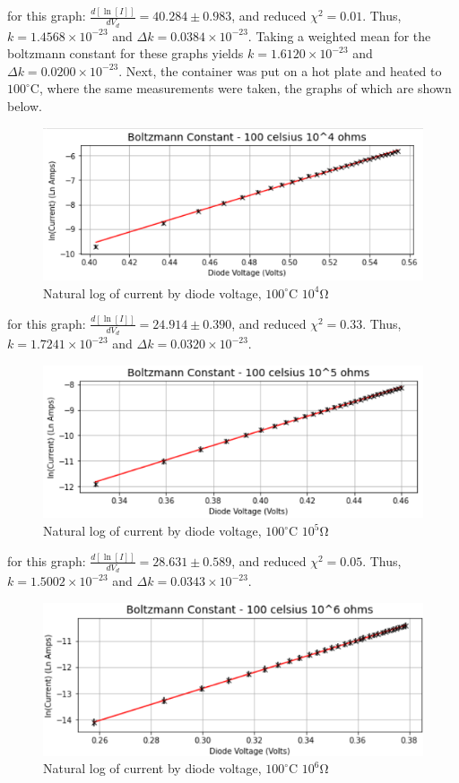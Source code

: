 \documentclass[12pt, a4paper]{article}
\begin{document}
	for this graph: $\frac{d[\ln [I]]}{dV_d} = 40.284 \pm 0.983$, and reduced $\chi^2 = 0.01$. Thus, $k = 1.4568 \times 10^{-23}$ and $\Delta k = 0.0384 \times 10^{-23}$.
	\linebreak
	Taking a weighted mean for the boltzmann constant for these graphs yields $k = 1.6120 \times 10^{-23}$ and $\Delta k = 0.0200 \times 10^{-23}$.
	\linebreak
	Next, the container was put on a hot plate and heated to $100^{\circ}$C, where the same measurements were taken, the graphs of which are shown below.
	\begin{figure}[H] \centering
		\includegraphics[scale=0.7]{assets/bcgraph_1c4o.png}
		\caption{Natural log of current by diode voltage, $100^{\circ}$C $10^4$\si{\ohm}}
	\end{figure}
	for this graph: $\frac{d[\ln [I]]}{dV_d} = 24.914 \pm 0.390$, and reduced $\chi^2 = 0.33$. Thus, $k = 1.7241 \times 10^{-23}$ and $\Delta k = 0.0320 \times 10^{-23}$.
	\begin{figure}[H] \centering
		\includegraphics[scale=0.7]{assets/bcgraph_1c5o.png}
		\caption{Natural log of current by diode voltage, $100^{\circ}$C $10^5$\si{\ohm}}
	\end{figure}
	for this graph: $\frac{d[\ln [I]]}{dV_d} = 28.631 \pm 0.589$, and reduced $\chi^2 = 0.05$. Thus, $k = 1.5002 \times 10^{-23}$ and $\Delta k = 0.0343 \times 10^{-23}$.
	\begin{figure}[H] \centering
		\includegraphics[scale=0.7]{assets/bcgraph_1c6o.png}
		\caption{Natural log of current by diode voltage, $100^{\circ}$C $10^6$\si{\ohm}}
	\end{figure}
\end{document}
